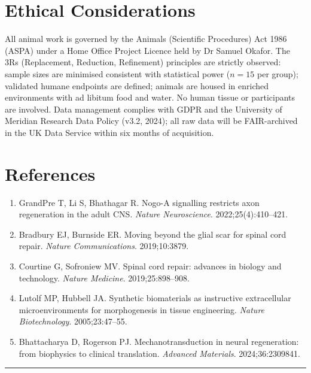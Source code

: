 \documentclass[11pt,a4paper]{article}
\begin{document}
\section{Ethical Considerations}

All animal work is governed by the Animals (Scientific Procedures) Act 1986 (ASPA) under
a Home Office Project Licence held by Dr Samuel Okafor. The 3Rs (Replacement, Reduction,
Refinement) principles are strictly observed: sample sizes are minimised consistent with
statistical power (\(n = 15\) per group); validated humane endpoints are defined; animals
are housed in enriched environments with ad libitum food and water. No human tissue or
participants are involved. Data management complies with GDPR and the University of
Meridian Research Data Policy (v3.2, 2024); all raw data will be FAIR-archived in the
UK Data Service within six months of acquisition.

\section{References}

\vspace{4pt}
\begin{enumerate}[label=\lbrack\arabic*\rbrack, leftmargin=2em, itemsep=2pt]
  \item GrandPre T, Li S, Bhathagar R. Nogo-A signalling restricts axon regeneration
    in the adult CNS. \textit{Nature Neuroscience}. 2022;25(4):410--421.
  \item Bradbury EJ, Burnside ER. Moving beyond the glial scar for spinal cord repair.
    \textit{Nature Communications}. 2019;10:3879.
  \item Courtine G, Sofroniew MV. Spinal cord repair: advances in biology and technology.
    \textit{Nature Medicine}. 2019;25:898--908.
  \item Lutolf MP, Hubbell JA. Synthetic biomaterials as instructive extracellular
    microenvironments for morphogenesis in tissue engineering.
    \textit{Nature Biotechnology}. 2005;23:47--55.
  \item Bhattacharya D, Rogerson PJ. Mechanotransduction in neural regeneration:
    from biophysics to clinical translation. \textit{Advanced Materials}.
    2024;36:2309841.
\end{enumerate}

\vspace{10pt}
\noindent\rule{\linewidth}{0.5pt}
\vspace{2pt}

\end{document}
